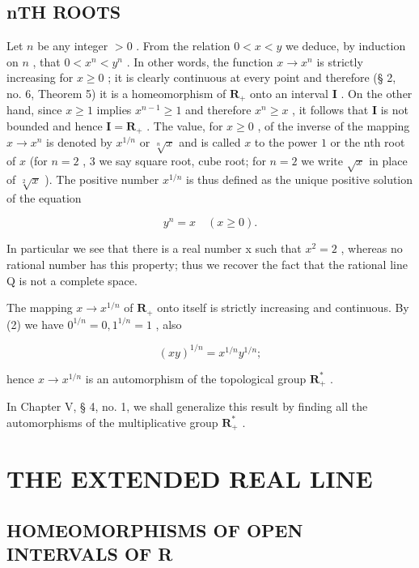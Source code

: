\subsection{nTH ROOTS}

Let \(n\) be any integer \(> 0\) . From the relation \(0 < x < y\) we deduce, by induction on \(n\) , that \(0 < x^n < y^n\) . In other words, the function \(x \to x^n\) is strictly increasing for \(x \geqslant 0\) ; it is clearly continuous at every point and therefore (§ 2, no. 6, Theorem 5) it is a homeomorphism of \(\mathbf{R}_{+}\) onto an interval \(\mathbf{I}\) . On the other hand, since \(x \geqslant 1\) implies \(x^{n-1} \geqslant 1\) and therefore \(x^n \geqslant x\) , it follows that \(\mathbf{I}\) is not bounded and hence \(\mathbf{I} = \mathbf{R}_{+}\) . The value, for \(x \geqslant 0\) , of the inverse of the mapping \(x \to x^n\) is denoted by \(x^{1/n}\) or \(\sqrt[n]{x}\) and is called \(x\) to the power \(1\) or the nth root of \(x\) (for \(n = 2\) , 3 we say square root, cube root; for \(n = 2\) we write \(\sqrt{x}\) in place of \(\sqrt[2]{x}\) ). The positive number \(x^{1/n}\) is thus defined as the unique positive solution of the equation

\[
y ^ {n} = x \quad (x \geqslant 0).\tag{2}
\]

In particular we see that there is a real number x such that \(x^{2}=2\) , whereas no rational number has this property; thus we recover the fact that the rational line Q is not a complete space.

The mapping \(x \to x^{1/n}\) of \(\mathbf{R}_+\) onto itself is strictly increasing and continuous. By (2) we have \(0^{1/n}=0, 1^{1/n}=1\) , also

\[
(x y) ^ {1 / n} = x ^ {1 / n} y ^ {1 / n};\tag{3}
\]

hence \(x \to x^{1/n}\) is an automorphism of the topological group \(\mathbf{R}_{+}^{*}\) .

In Chapter V, § 4, no. 1, we shall generalize this result by finding all the automorphisms of the multiplicative group \(\mathbf{R}_{+}^{*}\) .

\section{THE EXTENDED REAL LINE}

\subsection{HOMEOMORPHISMS OF OPEN INTERVALS OF R}

